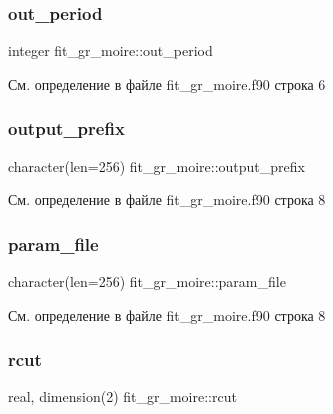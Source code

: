 \subsubsection{\texorpdfstring{out\+\_\+period}{out\_period}}
{\footnotesize\ttfamily integer fit\+\_\+gr\+\_\+moire\+::out\+\_\+period}



См. определение в файле fit\+\_\+gr\+\_\+moire.\+f90 строка 6

\mbox{\label{namespacefit__gr__moire_ac107a23a93efd6c7247949001b635744}} 
\subsubsection{\texorpdfstring{output\+\_\+prefix}{output\_prefix}}
{\footnotesize\ttfamily character(len=256) fit\+\_\+gr\+\_\+moire\+::output\+\_\+prefix}



См. определение в файле fit\+\_\+gr\+\_\+moire.\+f90 строка 8

\mbox{\label{namespacefit__gr__moire_a61b86e6a8a674b819bc9c8b166436c18}} 
\subsubsection{\texorpdfstring{param\+\_\+file}{param\_file}}
{\footnotesize\ttfamily character(len=256) fit\+\_\+gr\+\_\+moire\+::param\+\_\+file}



См. определение в файле fit\+\_\+gr\+\_\+moire.\+f90 строка 8

\mbox{\label{namespacefit__gr__moire_aa4a0f3a112959e7b4ce4105b57b1ac8b}} 
\subsubsection{\texorpdfstring{rcut}{rcut}}
{\footnotesize\ttfamily real, dimension(2) fit\+\_\+gr\+\_\+moire\+::rcut}



